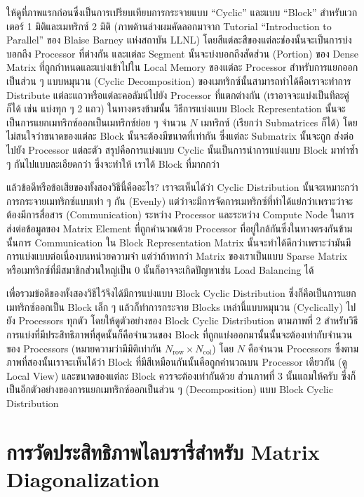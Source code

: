 ให้ดูที่ภาพแรกก่อนซึ่งเป็นการเปรียบเทียบการกระจายแบบ \enquote{Cyclic} และแบบ \enquote{Block} สำหรับเวกเตอร์ 1 มิติและเมทริกซ์
2 มิติ (ภาพด้านล่างผมคัดลอกมาจาก Tutorial \enquote{Introduction to Parallel} ของ Blaise Barney แห่งสถาบัน LLNL)
โดยสีแต่ละสีของแต่ละช่องนั้นจะเป็นการบ่งบอกถึง Processor ที่ต่างกัน และแต่ละ Segment นั้นจะบ่งบอกถึงสัดส่วน (Portion) ของ Dense
Matrix ที่ถูกกำหนดและแบ่งเข้าไปใน Local Memory ของแต่ละ Processor สำหรับการแยกออกเป็นส่วน ๆ แบบหมุนวน (Cyclic Decomposition)
ของเมทริกซ์นั้นสามารถทำได้คือเราจะทำการ Distribute แต่ละแถวหรือแต่ละคอลัมน์ไปยัง Processor ที่แตกต่างกัน (เราอาจจะแบ่งเป็นทีละคู่ก็ได้
เช่น แบ่งทุก ๆ 2 แถว) ในทางตรงข้ามนั้น วิธีการแบ่งแบบ Block Representation นั้นจะเป็นการแยกเมทริกซ์ออกเป็นเมทริกซ์ย่อย ๆ จำนวน
$N$ เมทริกซ์ (เรียกว่า Submatrices ก็ได้) โดยไม่สนใจว่าขนาดของแต่ละ Block นั้นจะต้องมีขนาดที่เท่ากัน ซึ่งแต่ละ Submatrix นั้นจะถูก%
ส่งต่อไปยัง Processor แต่ละตัว สรุปคือการแบ่งแบบ Cyclic นั้นเป็นการนำการแบ่งแบบ Block มาทำซ้ำ ๆ กันไปแบบละเอียดกว่า ซึ่งจะทำให้%
เราได้ Block ที่มากกว่า

แล้วข้อดีหรือข้อเสียของทั้งสองวิธีนี้คืออะไร? เราจะเห็นได้ว่า Cyclic Distribution นั้นจะเหมาะกว่าการกระจายเมทริกซ์แบบเท่า ๆ กัน (Evenly)
แต่ว่าจะมีการจัดการเมทริกซ์ที่ทำได้แย่กว่าเพราะว่าจะต้องมีการสื่อสาร (Communication) ระหว่าง Processor และระหว่าง Compute Node
ในการส่งต่อข้อมูลของ Matrix Element ที่ถูกคำนวณด้วย Processor ที่อยู่ใกล้กันซึ่งในทางตรงกันข้ามนั้นการ Communication ใน Block
Representation Matrix นั้นจะทำได้ดีกว่าเพราะว่ามันมีการแบ่งแบบต่อเนื่องบนหน่วยความจำ แต่ว่าถ้าหากว่า Matrix ของเราเป็นแบบ Sparse
Matrix หรือเมทริกซ์ที่มีสมาชิกส่วนใหญ่เป็น 0 นั้นก็อาจจะเกิดปัญหาเช่น Load Balancing ได้

เพื่อรวมข้อดีของทั้งสองวิธีไว้จึงได้มีการแบ่งแบบ Block Cyclic Distribution ซึ่งก็คือเป็นการแยกเมทริกซ์ออกเป็น Block เล็ก ๆ แล้วก็ทำการกระจาย
Blocks เหล่านี้แบบหมุนวน (Cyclically) ไปยัง Processors ทุกตัว โดยให้ดูตัวอย่างของ Block Cyclic Distribution ตามภาพที่ 2
สำหรับวิธีการแบ่งที่มีประสิทธิภาพที่สุดนั้นก็คือจำนวนของ Block ที่ถูกแบ่งออกมานั้นนั้นจะต้องเท่ากับจำนวนของ Processors
(หมายความว่ามีมิติเท่ากัน $N_{\text{row}} \times N_{\text{col}}$) โดย $N$ คือจำนวน Processors ซึ่งตามภาพที่สองนั้นเราจะเห็นได้ว่า
Block ที่มีสีเหมือนกันนั้นคือถูกคำนวณบน Processor เดียวกัน (ดู Local View) และขนาดของแต่ละ Block ควรจะต้องเท่ากันด้วย ส่วนภาพที่ 3
นั้นแถมให้ครับ ซึ่งก็เป็นอีกตัวอย่างของการแยกเมทริกซ์ออกเป็นส่วน ๆ (Decomposition) แบบ Block Cyclic Distribution

\section{การวัดประสิทธิภาพไลบรารี่สำหรับ Matrix Diagonalization}

